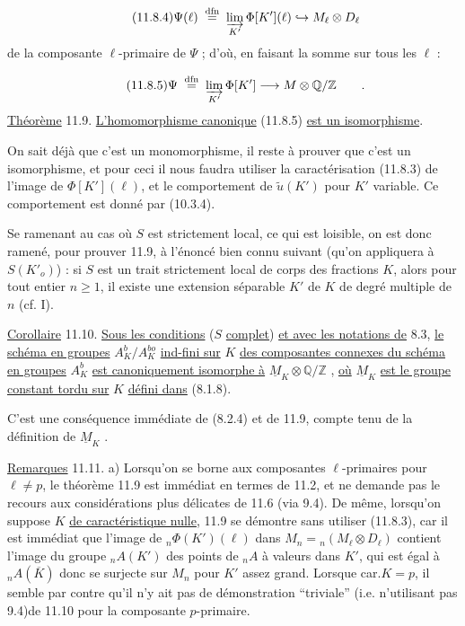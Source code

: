 \begin{equation}\tag{11.8.4}
\Psi(\ell) \;\overset{\mathrm{dfn}}{=}\; \varinjlim_{K'} \Phi[K'](\ell) \hookrightarrow M_\ell \otimes D_\ell
\end{equation}
de la composante $\ell$-primaire de $\Psi$ ; d'où, en faisant la somme sur tous les $\ell$ :

\begin{equation}\tag{11.8.5}
\Psi \;\overset{\mathrm{dfn}}{=}\; \varinjlim_{K'} \Phi[K'] \longrightarrow M \otimes \mathbb{Q}/\mathbb{Z} \qquad .
\end{equation}
\underline{Théorème} 11.9. \underline{L'homomorphisme canonique} (11.8.5) \underline{est un isomorphisme}.

On sait déjà que c'est un monomorphisme, il reste à prouver que c'est un isomorphisme, et pour ceci il nous faudra utiliser la caractérisation (11.8.3) de l'image de $\Phi[K'](\ell)$, et le comportement de $\widetilde{u}(K')$ pour $K'$ variable. Ce comportement est donné par (10.3.4).



Se ramenant au cas où $S$ est strictement local, ce qui est loisible, on est donc ramené, pour prouver 11.9, à l'énoncé bien connu suivant (qu'on appliquera à $S(K'_o)$) : si $S$ est un trait strictement local de corps des fractions $K$, alors pour tout entier $n \geqslant 1$, il existe une extension séparable $K'$ de $K$ de degré multiple de $n$ (cf. I\hspace{3em}).

\underline{Corollaire} 11.10. \underline{Sous les conditions} ($S$ \underline{complet}) \underline{et avec les notations de} 8.3, \underline{le schéma en groupes} $A^b_K/A^{bo}_K$ \underline{ind-fini sur} $K$ \underline{des composantes connexes du schéma en groupes} $A^b_K$ \underline{est canoniquement isomorphe à} $\underline{M}_K \otimes \mathbb{Q}/\mathbb{Z}$ , \underline{où} $\underline{M}_K$ \underline{est le groupe constant tordu sur} $K$ \underline{défini dans} (8.1.8).

C'est une conséquence immédiate de (8.2.4) et de 11.9, compte tenu de la définition de $\underline{M}_K$ .

\underline{Remarques} 11.11.  a) Lorsqu'on se borne aux composantes $\ell$-primaires pour $\ell \neq p$, le théorème 11.9 est immédiat en termes de 11.2, et ne demande pas le recours aux considérations plus délicates de 11.6 (via 9.4). De même, lorsqu'on suppose $K$ \underline{de caractéristique nulle}, 11.9 se démontre sans utiliser (11.8.3), car il est immédiat que l'image de ${}_n\Phi(K')(\ell)$ dans $M_n = {}_n(M_\ell \otimes D_\ell)$ contient l'image du groupe ${}_nA(K')$ des points de ${}_nA$ à valeurs dans $K'$, qui est égal à ${}_nA(\overline{K})$ donc se surjecte sur $M_n$ pour $K'$ assez grand. Lorsque car.$K = p$, il semble par contre qu'il n'y ait pas de démonstration ``triviale'' (i.e. n'utilisant pas 9.4)de 11.10 pour la composante $p$-primaire.

